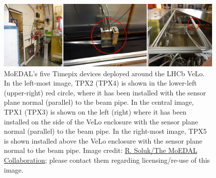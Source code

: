 %
\begin{figure}[htbp]
  \centering
  \includegraphics[width=1.0\textwidth]{assets/images/tpx/tpx.jpg}
  \caption[The MoEDAL Timepix detector array]
  {\label{fig:tpx}MoEDAL's five Timepix devices deployed around the %
\acs{LHCb} \acs{VeLo}. In the left-most image, TPX2 (TPX4) is shown %
in the lower-left (upper-right) red circle, where it has been installed %
with the sensor plane normal (parallel) to the beam pipe. %
In the central image, TPX1 (TPX3) is shown on the left (right) where it %
has been installed on the side of the \acs{VeLo} enclosure with the sensor %
plane normal (parallel) to the beam pipe. In the right-most image, TPX5 %
is shown installed above the \acs{VeLo} enclosure with the sensor plane %
normal to the beam pipe. %
Image credit: \href{http://moedal.web.cern.ch}{R. Soluk/The MoEDAL Collaboration}; %
please contact them regarding licensing/re-use of this image.}
\end{figure}
